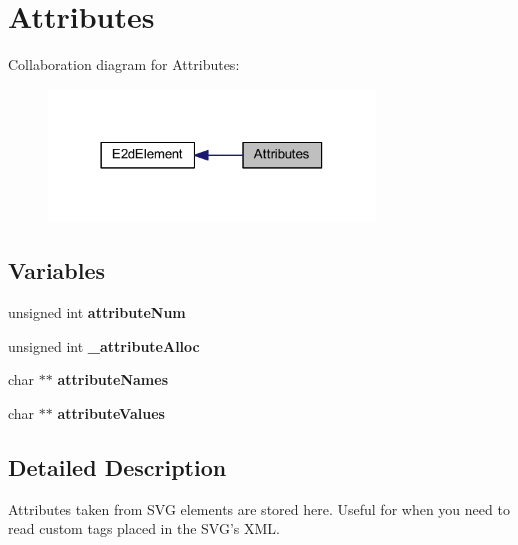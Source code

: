 \hypertarget{group__attributes}{\section{Attributes}
\label{group__attributes}
}
Collaboration diagram for Attributes\-:
\nopagebreak
\begin{figure}[H]
\begin{center}
\leavevmode
\includegraphics[width=246pt]{group__attributes}
\end{center}
\end{figure}
\subsection*{Variables}
\begin{DoxyCompactItemize}
\item 
\hypertarget{group__attributes_ga836181401227a3ca42da026a8d35e730}{unsigned int {\bfseries attribute\-Num}}\label{group__attributes_ga836181401227a3ca42da026a8d35e730}

\item 
\hypertarget{group__attributes_gaf7024549e867b39cb2a0eb86891394b9}{unsigned int {\bfseries \-\_\-attribute\-Alloc}}\label{group__attributes_gaf7024549e867b39cb2a0eb86891394b9}

\item 
\hypertarget{group__attributes_gaf9b5d9dbbf270b6f92a3ee66ce1b47ac}{char $\ast$$\ast$ {\bfseries attribute\-Names}}\label{group__attributes_gaf9b5d9dbbf270b6f92a3ee66ce1b47ac}

\item 
\hypertarget{group__attributes_gae8591ff93c366b4d66817a70f2d9f33e}{char $\ast$$\ast$ {\bfseries attribute\-Values}}\label{group__attributes_gae8591ff93c366b4d66817a70f2d9f33e}

\end{DoxyCompactItemize}


\subsection{Detailed Description}
Attributes taken from S\-V\-G elements are stored here. Useful for when you need to read custom tags placed in the S\-V\-G's X\-M\-L. 